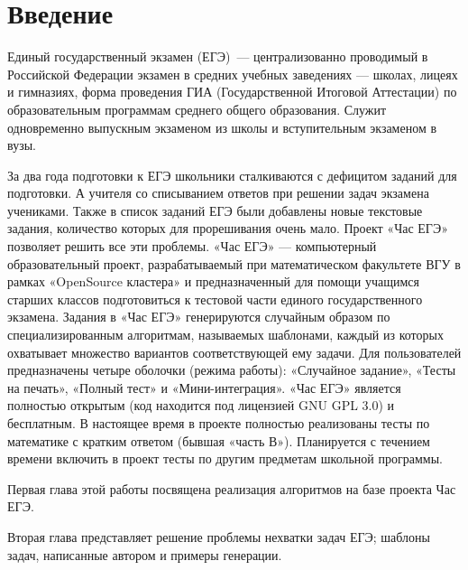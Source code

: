 
\section*{Введение}
Единый государственный экзамен (ЕГЭ)~— централизованно проводимый в Российской
Федерации экзамен в средних учебных заведениях — школах, лицеях и гимназиях,
форма проведения ГИА (Государственной Итоговой Аттестации) по образовательным программам среднего общего образования.
Служит одновременно выпускным экзаменом из школы и вступительным экзаменом в вузы.

За два года подготовки к ЕГЭ школьники сталкиваются с дефицитом заданий для подготовки. 
А учителя со списыванием ответов при решении задач экзамена учениками. 
Также в список заданий ЕГЭ были добавлены новые текстовые задания, 
количество которых для прорешивания очень мало.
Проект «Час ЕГЭ» позволяет решить все эти проблемы. «Час ЕГЭ» — компьютерный образовательный проект, 
разрабатываемый при математическом факультете ВГУ в рамках «OpenSource кластера» и предназначенный для помощи учащимся старших классов подготовиться к тестовой части единого государственного экзамена. 
Задания в «Час ЕГЭ» генерируются случайным образом по специализированным алгоритмам, называемых шаблонами, 
каждый из которых охватывает множество вариантов соответствующей ему задачи. 
Для пользователей предназначены четыре оболочки (режима работы): «Случайное задание», «Тесты на печать», «Полный тест» и «Мини-интеграция». 
«Час ЕГЭ» является полностью открытым (код находится под лицензией GNU GPL 3.0) и бесплатным. 
В настоящее время в проекте полностью реализованы тесты по математике с кратким ответом (бывшая «часть В»). 
Планируется с течением времени включить в проект тесты по другим предметам школьной программы.

Первая глава этой работы посвящена реализация алгоритмов на базе проекта Час ЕГЭ.

Вторая глава представляет решение проблемы нехватки задач ЕГЭ; шаблоны задач, написанные автором и примеры генерации.